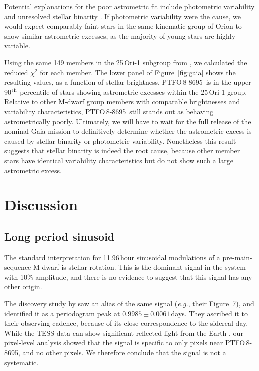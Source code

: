 \documentclass[12pt,twocolumn,tighten]{aastex62}
\newcommand{\ptfo}{PTFO$\,$8-8695}
\begin{document}
Potential explanations for the poor astrometric fit include
photometric variability and unresolved stellar binarity \citep[{\it
e.g.},][]{rizzuto_ZEIT8_2018,belokurov_unresolved_2020}.  If
photometric variability were the cause, we would expect comparably
faint stars in the same kinematic group of Orion to show similar
astrometric excesses, as the majority of young stars are highly
variable.

Using the same 149 members in the 25$\,$Ori-1 subgroup from
\citet{kounkel_apogee2_2018}, we calculated the reduced $\chi^2$ for
each member.  The lower panel of Figure~\ref{fig:gaia} shows the
resulting values, as a function of stellar brightness.  \ptfo\ is in
the upper 90$^{\rm th}$ percentile of stars showing astrometric
excesses within the 25$\,$Ori-1 group.  Relative to other M-dwarf
group members with comparable brightnesses and variability
characteristics, \ptfo\ still stands out as behaving astrometrically
poorly.  Ultimately, we will have to wait for the full release of the
nominal Gaia mission to definitively determine whether the astrometric
excess is caused by stellar binarity or photometric variability.
Nonetheless this result suggests that stellar binarity is indeed the
root cause, because other member stars have identical variability
characteristics but do not show such a large astrometric excess.



\section{Discussion}
\label{sec:discussion}

\subsection{Long period sinusoid}

The standard interpretation for 11.96$\,$hour sinusoidal modulations
of a pre-main-sequence M dwarf is stellar rotation.  This is the
dominant signal in the system with 10\% amplitude, and there is no
evidence to suggest that this signal has any other origin.

The discovery study by \citet{van_eyken_ptf_2012} saw an alias of the
same signal ({\it e.g.}, their Figure~7), and identified it as a
periodogram peak at $0.9985 \pm 0.0061\,$days. They ascribed it to
their observing cadence, because of its close correspondence to the
sidereal day.  While the TESS data can show significant reflected
light from the Earth \citep[{\it e.g.},][]{luger_tess_2019}, our
pixel-level analysis showed that the signal is specific to only pixels
near \ptfo, and no other pixels.  We therefore conclude that the
signal is not a systematic.
\end{document}
